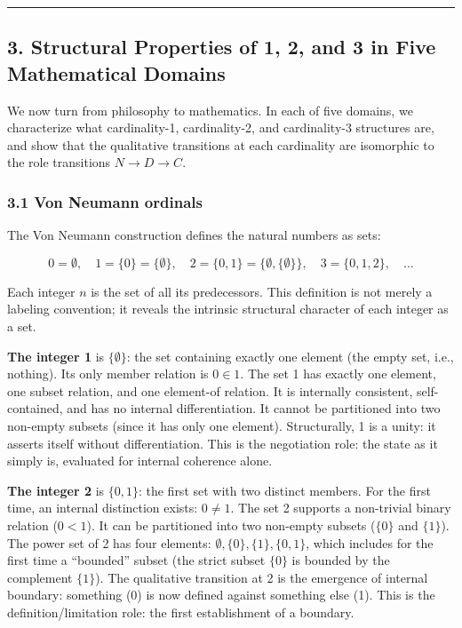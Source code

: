 \documentclass[
  11pt,
  letterpaper,
]{article}
\begin{document}
\begin{center}\rule{0.5\linewidth}{0.5pt}\end{center}

\subsection{3. Structural Properties of 1, 2, and 3 in Five Mathematical
Domains}\label{structural-properties-of-1-2-and-3-in-five-mathematical-domains}

We now turn from philosophy to mathematics. In each of five domains, we
characterize what cardinality-1, cardinality-2, and cardinality-3
structures are, and show that the qualitative transitions at each
cardinality are isomorphic to the role transitions \(N \to D \to C\).

\subsubsection{3.1 Von Neumann ordinals}\label{von-neumann-ordinals}

The Von Neumann construction defines the natural numbers as sets:

\[0 = \emptyset, \quad 1 = \{0\} = \{\emptyset\}, \quad 2 = \{0,1\} = \{\emptyset, \{\emptyset\}\}, \quad 3 = \{0,1,2\}, \quad \ldots\]

Each integer \(n\) is the set of all its predecessors. This definition
is not merely a labeling convention; it reveals the intrinsic structural
character of each integer as a set.

\textbf{The integer 1} is \(\{\emptyset\}\): the set containing exactly
one element (the empty set, i.e., nothing). Its only member relation is
\(0 \in 1\). The set 1 has exactly one element, one subset relation, and
one element-of relation. It is internally consistent, self-contained,
and has no internal differentiation. It cannot be partitioned into two
non-empty subsets (since it has only one element). Structurally, 1 is a
unity: it asserts itself without differentiation. This is the
negotiation role: the state as it simply is, evaluated for internal
coherence alone.

\textbf{The integer 2} is \(\{0, 1\}\): the first set with two distinct
members. For the first time, an internal distinction exists:
\(0 \neq 1\). The set 2 supports a non-trivial binary relation
(\(0 < 1\)). It can be partitioned into two non-empty subsets (\(\{0\}\)
and \(\{1\}\)). The power set of 2 has four elements:
\(\emptyset, \{0\}, \{1\}, \{0,1\}\), which includes for the first time
a ``bounded'' subset (the strict subset \(\{0\}\) is bounded by the
complement \(\{1\}\)). The qualitative transition at 2 is the emergence
of internal boundary: something (0) is now defined against something
else (1). This is the definition/limitation role: the first
establishment of a boundary.
\end{document}
